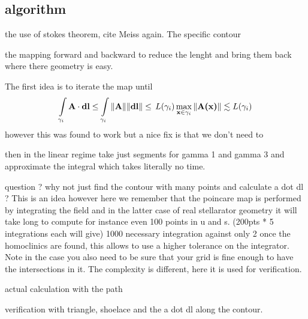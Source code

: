 \subsection{algorithm}

the use of stokes theorem, cite Meiss again.
The specific contour

the mapping forward and backward to reduce the lenght and bring them back where there geometry is easy.

The first idea is to iterate the map until 
\begin{align*}
    \int\limits_{\gamma_i} \textbf{A}\cdot\textbf{dl} \leq \int\limits_{\gamma_i} \Vert\textbf{A}\Vert \Vert\textbf{dl}\Vert \leq\, L(\gamma_i)\max\limits_{\textbf{x} \in\gamma_i}\Vert\textbf{A(\textbf{x})}\Vert \lesssim L(\gamma_i)
\end{align*}
however this was found to work but a nice fix is that we don't need to 

then in the linear regime take just segments for gamma 1 and gamma 3 and approximate the integral which takes literally no time.

question ? why not just find the contour with many points and calculate a dot dl ? This is an idea however here we remember that the poincare map is performed by integrating the field and in the latter case of real stellarator geometry it will take long to compute for instance even 100 points in u and s. (200pts * 5 integrations each will give) 1000 necessary integration against only 2 once the homoclinics are found, this allows to use a higher tolerance on the integrator. Note in the case you also need to be sure that your grid is fine enough to have the intersections in it. The complexity is different, here it is used for verification.

actual calculation with the path 

verification with triangle, shoelace and the a dot dl along the contour.